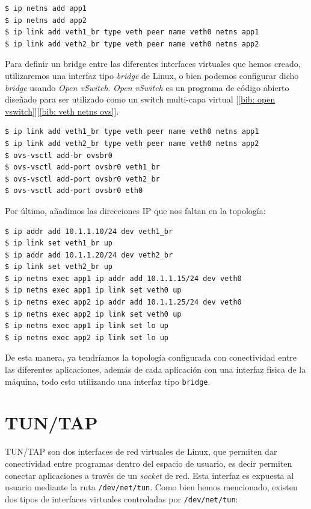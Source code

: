 \documentclass[a4paper, oneside, 12pt]{book}
\begin{document}
	\begin{verbatim}
$ ip netns add app1
$ ip netns add app2
$ ip link add veth1_br type veth peer name veth0 netns app1
$ ip link add veth2_br type veth peer name veth0 netns app2

	\end{verbatim}
	
	\noindent Para definir un bridge entre las diferentes interfaces virtuales que hemos creado, utilizaremos una interfaz tipo \textit{bridge} de Linux, o bien podemos configurar dicho \textit{bridge} usando \textit{Open vSwitch}. \textit{Open vSwitch} es un programa de código abierto diseñado para ser utilizado como un switch multi-capa virtual [\ref{bib: open vswitch}][\ref{bib: veth netns ovs}].
	
	\begin{verbatim}
$ ip link add veth1_br type veth peer name veth0 netns app1
$ ip link add veth2_br type veth peer name veth0 netns app2
$ ovs-vsctl add-br ovsbr0
$ ovs-vsctl add-port ovsbr0 veth1_br
$ ovs-vsctl add-port ovsbr0 veth2_br
$ ovs-vsctl add-port ovsbr0 eth0
	\end{verbatim}

	\noindent Por último, añadimos las direcciones IP que nos faltan en la topología:
	
	\begin{verbatim}
$ ip addr add 10.1.1.10/24 dev veth1_br
$ ip link set veth1_br up
$ ip addr add 10.1.1.20/24 dev veth2_br
$ ip link set veth2_br up
$ ip netns exec app1 ip addr add 10.1.1.15/24 dev veth0
$ ip netns exec app1 ip link set veth0 up
$ ip netns exec app2 ip addr add 10.1.1.25/24 dev veth0
$ ip netns exec app2 ip link set veth0 up
$ ip netns exec app1 ip link set lo up
$ ip netns exec app2 ip link set lo up
	\end{verbatim}

	\noindent De esta manera, ya tendríamos la topología configurada con conectividad entre las diferentes aplicaciones, además de cada aplicación con una interfaz física de la máquina, todo esto utilizando una interfaz tipo \texttt{bridge}.

	\section{TUN/TAP}
	\noindent TUN/TAP son dos interfaces de red virtuales de Linux, que permiten dar conectividad entre programas dentro del espacio de usuario, es decir permiten conectar aplicaciones a través de un \textit{socket} de red. Esta interfaz es expuesta al usuario mediante la ruta \texttt{/dev/net/tun}. Como bien hemos mencionado, existen dos tipos de interfaces virtuales controladas por \texttt{/dev/net/tun}: 
	
\end{document}
